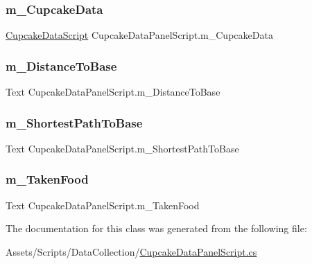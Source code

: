 \subsubsection{\texorpdfstring{m\_CupcakeData}{m\_CupcakeData}}
{\footnotesize\ttfamily \mbox{\hyperlink{class_cupcake_data_script}{Cupcake\+Data\+Script}} Cupcake\+Data\+Panel\+Script.\+m\+\_\+\+Cupcake\+Data}

\mbox{\label{class_cupcake_data_panel_script_afc037dff81ff22a9ac7bfd8a1b84b9ed}} 
\subsubsection{\texorpdfstring{m\_DistanceToBase}{m\_DistanceToBase}}
{\footnotesize\ttfamily Text Cupcake\+Data\+Panel\+Script.\+m\+\_\+\+Distance\+To\+Base}

\mbox{\label{class_cupcake_data_panel_script_a3b1f5c7abdf157f8c906e8b0e61266a1}} 
\subsubsection{\texorpdfstring{m\_ShortestPathToBase}{m\_ShortestPathToBase}}
{\footnotesize\ttfamily Text Cupcake\+Data\+Panel\+Script.\+m\+\_\+\+Shortest\+Path\+To\+Base}

\mbox{\label{class_cupcake_data_panel_script_aa8068f4f395002177180ed78204d204f}} 
\subsubsection{\texorpdfstring{m\_TakenFood}{m\_TakenFood}}
{\footnotesize\ttfamily Text Cupcake\+Data\+Panel\+Script.\+m\+\_\+\+Taken\+Food}



The documentation for this class was generated from the following file\+:\begin{DoxyCompactItemize}
\item 
Assets/\+Scripts/\+Data\+Collection/\mbox{\hyperlink{_cupcake_data_panel_script_8cs}{Cupcake\+Data\+Panel\+Script.\+cs}}\end{DoxyCompactItemize}
